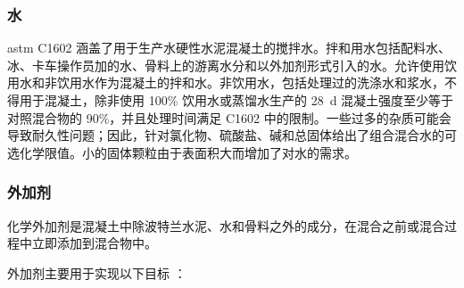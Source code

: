\subsubsection{水}
\acrshort*{astm} C1602 涵盖了用于生产水硬性水泥混凝土的搅拌水。拌和用水包括配料水、冰、卡车操作员加的水、骨料上的游离水分和以外加剂形式引入的水。允许使用饮用水和非饮用水作为混凝土的拌和水。非饮用水，包括处理过的洗涤水和浆水，不得用于混凝土，除非使用 100\% 饮用水或蒸馏水生产的 \qty{28}{d} 混凝土强度至少等于对照混合物的 90\%，并且处理时间满足 C1602 中的限制。一些过多的杂质可能会导致耐久性问题；因此，针对氯化物、硫酸盐、碱和总固体给出了组合混合水的可选化学限值。小的固体颗粒由于表面积大而增加了对水的需求。

\subsubsection{外加剂}
化学外加剂是混凝土中除波特兰水泥、水和骨料之外的成分，在混合之前或混合过程中立即添加到混合物中。

外加剂主要用于实现以下目标 \cite{kosmatka2011d}：

